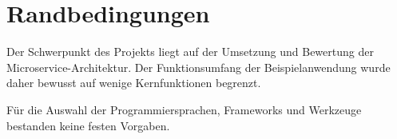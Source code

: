 \section{Randbedingungen}

Der Schwerpunkt des Projekts liegt auf der Umsetzung und Bewertung der Microservice-Architektur.
Der Funktionsumfang der Beispielanwendung wurde daher bewusst auf wenige Kernfunktionen begrenzt.

Für die Auswahl der Programmiersprachen, Frameworks und Werkzeuge bestanden
keine festen Vorgaben.